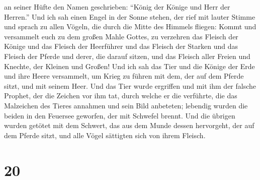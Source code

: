 an seiner Hüfte den Namen geschrieben: ``König der Könige und Herr der
Herren.''  Und ich sah einen Engel in der Sonne stehen,
der rief mit lauter Stimme und sprach zu allen Vögeln, die durch die
Mitte des Himmels fliegen: Kommt und versammelt euch zu dem großen Mahle
Gottes,  zu verzehren das Fleisch der Könige und das
Fleisch der Heerführer und das Fleisch der Starken und das Fleisch der
Pferde und derer, die darauf sitzen, und das Fleisch aller Freien und
Knechte, der Kleinen und Großen!  Und ich sah das Tier
und die Könige der Erde und ihre Heere versammelt, um Krieg zu führen
mit dem, der auf dem Pferde sitzt, und mit seinem Heer. 
Und das Tier wurde ergriffen und mit ihm der falsche Prophet, der die
Zeichen vor ihm tat, durch welche er die verführte, die das Malzeichen
des Tieres annahmen und sein Bild anbeteten; lebendig wurden die beiden
in den Feuersee geworfen, der mit Schwefel brennt.  Und
die übrigen wurden getötet mit dem Schwert, das aus dem Munde dessen
hervorgeht, der auf dem Pferde sitzt, und alle Vögel sättigten sich von
ihrem Fleisch.

\hypertarget{section-19}{%
\section{20}\label{section-19}}


